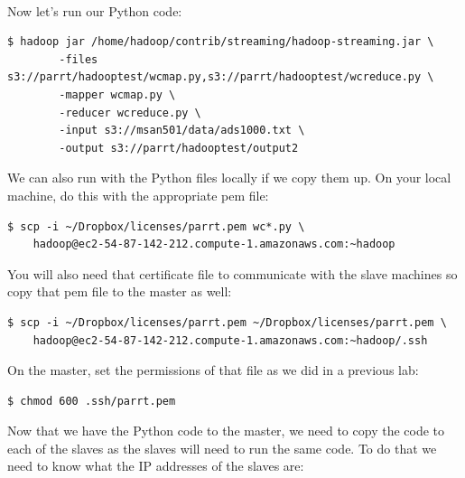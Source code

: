 \begin{fullwidth}
\begin{center}
\end{center}
~\\

Now let's run our Python code:

\begin{lstlisting}[style=BashInputStyle]
$ hadoop jar /home/hadoop/contrib/streaming/hadoop-streaming.jar \
    	-files s3://parrt/hadooptest/wcmap.py,s3://parrt/hadooptest/wcreduce.py \
    	-mapper wcmap.py \
    	-reducer wcreduce.py \
    	-input s3://msan501/data/ads1000.txt \
    	-output s3://parrt/hadooptest/output2
\end{lstlisting}

\noindent We can also run with the Python files locally if we copy them up. On your local machine, do this with the appropriate pem file:

\begin{lstlisting}[style=BashInputStyle]
$ scp -i ~/Dropbox/licenses/parrt.pem wc*.py \
    hadoop@ec2-54-87-142-212.compute-1.amazonaws.com:~hadoop
\end{lstlisting}

\noindent You will also need that certificate file to communicate with the slave machines so copy that pem file to the master as well:

\begin{lstlisting}[style=BashInputStyle]
$ scp -i ~/Dropbox/licenses/parrt.pem ~/Dropbox/licenses/parrt.pem \
    hadoop@ec2-54-87-142-212.compute-1.amazonaws.com:~hadoop/.ssh
\end{lstlisting}

\noindent On the master, set the permissions of that file as we did in a previous lab:

\begin{lstlisting}[style=BashInputStyle]
$ chmod 600 .ssh/parrt.pem
\end{lstlisting}

\noindent  Now that we have the Python code to the master, we need to copy the code to each of the slaves as the slaves will need to run the same code. To do that we need to know what the IP addresses of the slaves are:


\end{fullwidth}
